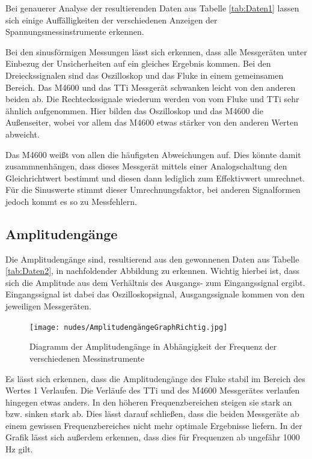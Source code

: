 \documentclass[12pt,a4paper,twoside]{article}
\begin{document}
 Bei genauerer Analyse der resultierenden Daten aus Tabelle \ref{tab:Daten1} lassen sich einige Auffälligkeiten der verschiedenen Anzeigen der Spannungsmessinstrumente erkennen. \newline

\noindent
Bei den sinusförmigen Messungen lässt sich erkennen, dass alle Messgeräten unter Einbezug der Unsicherheiten auf ein gleiches Ergebnis kommen.
Bei den Dreieckssignalen sind das Oszilloskop und das Fluke in einem gemeinsamen Bereich. Das M4600 und das TTi Messgerät schwanken leicht von den anderen beiden ab.
Die Rechteckssignale wiederum werden von vom Fluke und TTi sehr ähnlich aufgenommen. Hier bilden das Oszilloskop und das M4600 die Außenseiter, wobei vor allem das M4600 etwas stärker von den anderen Werten abweicht. \newline

\noindent
Das M4600 weißt von allen die häufigsten Abweichungen auf. Dies könnte damit zusammnenhängen, dass dieses Messgerät mittels einer Analogschaltung den Gleichrichtwert bestimmt und diesen dann lediglich zum Effektivwert umrechnet. 
Für die Sinuswerte stimmt dieser Umrechnungsfaktor, bei anderen Signalformen jedoch kommt es so zu Messfehlern. 


\subsection{Amplitudengänge}

Die Amplitudengänge sind, resultierend aus den gewonnenen Daten aus Tabelle \ref{tab:Daten2}, in nachfoldender Abbildung zu erkennen.
Wichtig hierbei ist, dass sich die Amplitude aus dem Verhältnis des Ausgangs- zum Eingangssignal ergibt.
Eingangssignal ist dabei das Oszilloskopsignal, Ausgangssignale kommen von den jeweiligen Messgeräten.

\begin{figure}[H]
    \centering
    \texttt{[image: nudes/AmplitudengängeGraphRichtig.jpg]}
    \caption{Diagramm der Amplitudengänge in Abhängigkeit der Frequenz der verschiedenen Messinstrumente}
    \label{fig:Amplitudengänge}
\end{figure}

\noindent
Es lässt sich erkennen, dass die Amplitudengänge des Fluke stabil im Bereich des Wertes 1 Verlaufen. 
Die Verläufe des TTi und des M4600 Messgerätes verlaufen hingegen etwas anders. In den höheren Frequenzbereichen steigen sie stark an bzw. sinken stark ab.
Dies lässt darauf schließen, dass die beiden Messgeräte ab einem gewissen Frequenzbereiches nicht mehr optimale Ergebnisse liefern. 
In der Grafik lässt sich außerdem erkennen, dass dies für Frequenzen ab ungefähr 1000 Hz gilt.
\end{document}
